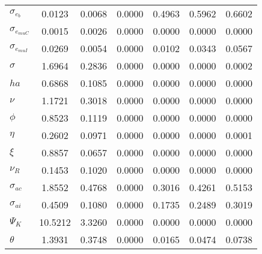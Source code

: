 \begin{center}
\begin{longtable}{lcccccc}
$ \sigma_{{e_b}}       $	 & 	          0.0123	 & 	          0.0068	 & 	          0.0000	 & 	          0.4963	 & 	          0.5962	 & 	          0.6602 \\ 
$ \sigma_{{e_{muC}}}   $	 & 	          0.0015	 & 	          0.0026	 & 	          0.0000	 & 	          0.0000	 & 	          0.0000	 & 	          0.0000 \\ 
$ \sigma_{{e_{muI}}}   $	 & 	          0.0269	 & 	          0.0054	 & 	          0.0000	 & 	          0.0102	 & 	          0.0343	 & 	          0.0567 \\ 
$ {\sigma}             $	 & 	          1.6964	 & 	          0.2836	 & 	          0.0000	 & 	          0.0000	 & 	          0.0000	 & 	          0.0002 \\ 
$ {ha}                 $	 & 	          0.6868	 & 	          0.1085	 & 	          0.0000	 & 	          0.0000	 & 	          0.0000	 & 	          0.0000 \\ 
$ \nu                  $	 & 	          1.1721	 & 	          0.3018	 & 	          0.0000	 & 	          0.0000	 & 	          0.0000	 & 	          0.0000 \\ 
$ {\phi}               $	 & 	          0.8523	 & 	          0.1119	 & 	          0.0000	 & 	          0.0000	 & 	          0.0000	 & 	          0.0000 \\ 
$ {\eta}               $	 & 	          0.2602	 & 	          0.0971	 & 	          0.0000	 & 	          0.0000	 & 	          0.0000	 & 	          0.0001 \\ 
$ \xi                  $	 & 	          0.8857	 & 	          0.0657	 & 	          0.0000	 & 	          0.0000	 & 	          0.0000	 & 	          0.0000 \\ 
$ {\nu_R}              $	 & 	          0.1453	 & 	          0.1020	 & 	          0.0000	 & 	          0.0000	 & 	          0.0000	 & 	          0.0000 \\ 
$ {\sigma_{ac}}        $	 & 	          1.8552	 & 	          0.4768	 & 	          0.0000	 & 	          0.3016	 & 	          0.4261	 & 	          0.5153 \\ 
$ {\sigma_{ai}}        $	 & 	          0.4509	 & 	          0.1080	 & 	          0.0000	 & 	          0.1735	 & 	          0.2489	 & 	          0.3019 \\ 
$ {\Psi_{K}}           $	 & 	         10.5212	 & 	          3.3260	 & 	          0.0000	 & 	          0.0000	 & 	          0.0000	 & 	          0.0000 \\ 
$ {\theta}             $	 & 	          1.3931	 & 	          0.3748	 & 	          0.0000	 & 	          0.0165	 & 	          0.0474	 & 	          0.0738 \\ 

\end{longtable}
\end{center}
